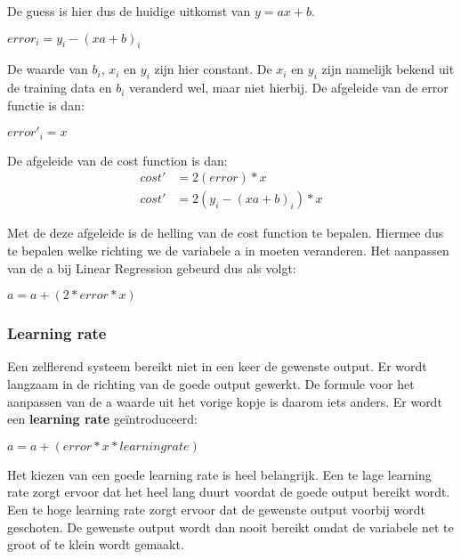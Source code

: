 De guess is hier dus de huidige uitkomst van $ y = ax + b $.

\begin{center}
$ error_{i} = y_{i} - (xa + b)_{i}$
\end{center}

De waarde van $ b_{i} $, $ x_{i} $ en $ y_{i} $ zijn hier constant. De $ x_{i} $ en $ y_{i} $ zijn namelijk bekend uit de training data en $ b_{i} $ veranderd wel, maar niet hierbij. De afgeleide van de error functie is dan:

\begin{center}
$ error'_{i} = x$
\end{center}

De afgeleide van de cost function is dan:
\begin{align}
cost' &= 2(error) * x \\
cost' &= 2(y_{i} - (xa + b)_{i}) * x
\end{align}

Met de deze afgeleide is de helling van de cost function te bepalen. Hiermee dus te bepalen welke richting we de variabele a in moeten veranderen. Het aanpassen van de a bij Linear Regression gebeurd dus als volgt:

\begin{center}
$ a = a + (2 * error * x)$
\end{center}

\subsubsection{Learning rate}
Een zelflerend systeem bereikt niet in een keer de gewenste output. Er wordt langzaam in de richting van de goede output gewerkt. De formule voor het aanpassen van de a waarde uit het vorige kopje is daarom iets anders. Er wordt een \textbf{learning rate} geïntroduceerd:

\begin{center}
$ a = a + (error * x * learning rate)$
\end{center}

Het kiezen van een goede learning rate is heel belangrijk. Een te lage learning rate zorgt ervoor dat het heel lang duurt voordat de goede output bereikt wordt. Een te hoge learning rate zorgt ervoor dat de gewenste output voorbij wordt geschoten. De gewenste output wordt dan nooit bereikt omdat de variabele net te groot of te klein wordt gemaakt. \cite{GradientDescent1}\cite{GradientDescent2}

